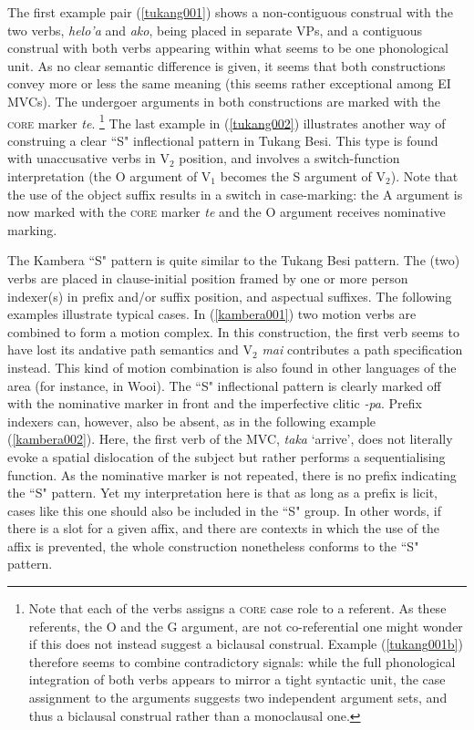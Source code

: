 The first example pair (\ref{tukang001}) shows a non-contiguous construal with the two verbs, \textit{helo'a} and \textit{ako}, being placed in separate VPs, and a contiguous construal with both verbs appearing within what seems to be one phonological unit. As no clear semantic difference is given, it seems that both constructions convey more or less the same meaning (this seems rather exceptional among EI MVCs). The undergoer arguments in both constructions are marked with the \textsc{core} marker \textit{te}. \footnote{Note that each of the verbs assigns a \textsc{core} case role to a referent. As these referents, the O and the G argument, are not co-referential one might wonder if this does not instead suggest a biclausal construal. Example (\ref{tukang001b}) therefore seems to combine contradictory signals: while the full phonological integration of both verbs appears to mirror a tight syntactic unit, the case assignment to the arguments suggests two independent argument sets, and thus a biclausal construal rather than a monoclausal one.} The last example in (\ref{tukang002}) illustrates another way of construing a clear ``S" inflectional pattern in Tukang Besi. This type is found with unaccusative verbs in V$_2$ position, and involves a switch-function interpretation (the O argument of V$_1$ becomes the S argument of V$_2$). Note that the use of the object suffix results in a switch in case-marking: the A argument is now marked with the \textsc{core} marker \textit{te} and the O argument receives nominative marking.

The Kambera ``S" pattern is quite similar to the Tukang Besi pattern. The (two) verbs are placed in clause-initial position framed by one or more person indexer(s) in prefix and/or suffix position, and aspectual suffixes. The following examples illustrate typical cases. In (\ref{kambera001}) two motion verbs are combined to form a motion complex. In this construction, the first verb seems to have lost its andative path semantics and V$_2$ \textit{mai} contributes a path specification instead. This kind of motion combination is also found in other languages of the area (for instance, in Wooi). The ``S" inflectional pattern is clearly marked off with the nominative marker in front and the imperfective clitic \textit{-pa}. Prefix indexers can, however, also be absent, as in the following example (\ref{kambera002}). Here, the first verb of the MVC, \textit{taka} `arrive', does not literally evoke a spatial dislocation of the subject but rather performs a sequentialising function. As the nominative marker is not repeated, there is no prefix indicating the ``S" pattern. Yet my interpretation here is that as long as a prefix is licit, cases like this one should also be included in the ``S" group. In other words, if there is a slot for a given affix, and there are contexts in which the use of the affix is prevented, the whole construction nonetheless conforms to the ``S" pattern.

